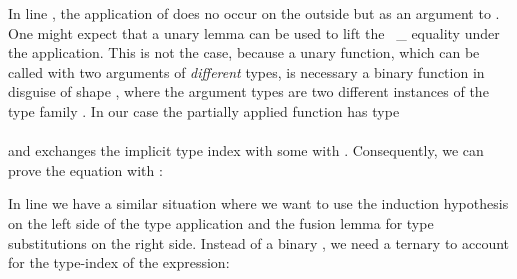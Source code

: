 \documentclass[sigplan,anonymous,review,screen]{acmart}
\begin{document}
In line , the application of {} does no occur on the outside but as an argument to
. One might expect that a unary {} lemma can be used to
lift the {~\_} equality under the application.
This is not the case, because a unary function, which can be called with two arguments of
\emph{different} types, is necessary a binary function in disguise of shape
, where the argument types are two different instances
of the type family . In our case the partially applied function 
has type\\
\\
and {} exchanges the implicit type index  with
some  with .
Consequently, we can prove the equation with {}:
\SubstExamplesFusionESubESubHetProofA



In line  we have a similar situation where we want to use the
induction hypothesis on the left side of the type application and the
fusion lemma for type substitutions on the right side.  Instead of a
binary {}, we need a ternary {} to account
for the type-index of the expression:
\SubstExamplesFusionESubESubHetProofC
\end{document}
